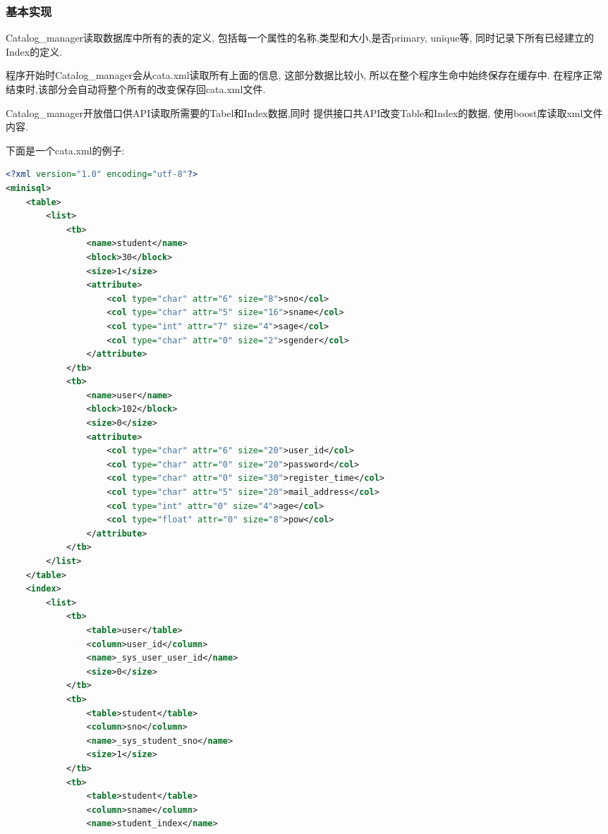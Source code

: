 \documentclass[10pt]{article}
\begin{document}
\begin{CJK}{UTF8}{gkai}
		\subsubsection{基本实现}
	\par Catalog\_manager读取数据库中所有的表的定义, 包括每一个属性的名称,类型和大小,是否primary, unique等, 同时记录下所有已经建立的Index的定义. 
	\par 程序开始时Catalog\_manager会从cata.xml读取所有上面的信息, 这部分数据比较小, 所以在整个程序生命中始终保存在缓存中. 在程序正常结束时,该部分会自动将整个所有的改变保存回cata.xml文件.
	\par Catalog\_manager开放借口供API读取所需要的Tabel和Index数据,同时 提供接口共API改变Table和Index的数据, 使用boost库读取xml文件内容.
	\par 下面是一个cata.xml的例子:
\begin{lstlisting}[language=xml]
<?xml version="1.0" encoding="utf-8"?>
<minisql>
    <table>
        <list>
            <tb>
                <name>student</name>
                <block>30</block>
                <size>1</size>
                <attribute>
                    <col type="char" attr="6" size="8">sno</col>
                    <col type="char" attr="5" size="16">sname</col>
                    <col type="int" attr="7" size="4">sage</col>
                    <col type="char" attr="0" size="2">sgender</col>
                </attribute>
            </tb>
            <tb>
                <name>user</name>
                <block>102</block>
                <size>0</size>
                <attribute>
                    <col type="char" attr="6" size="20">user_id</col>
                    <col type="char" attr="0" size="20">password</col>
                    <col type="char" attr="0" size="30">register_time</col>
                    <col type="char" attr="5" size="20">mail_address</col>
                    <col type="int" attr="0" size="4">age</col>
                    <col type="float" attr="0" size="8">pow</col>
                </attribute>
            </tb>
        </list>
    </table>
    <index>
        <list>
            <tb>
                <table>user</table>
                <column>user_id</column>
                <name>_sys_user_user_id</name>
                <size>0</size>
            </tb>
            <tb>
                <table>student</table>
                <column>sno</column>
                <name>_sys_student_sno</name>
                <size>1</size>
            </tb>
            <tb>
                <table>student</table>
                <column>sname</column>
                <name>student_index</name>

\end{lstlisting}
\end{CJK}
\end{document}
